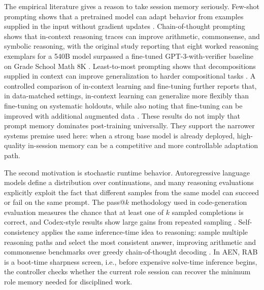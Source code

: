 \documentclass[11pt]{article}
\newcommand{\rab}{RAB}
\begin{document}
The empirical literature gives a reason to take session memory seriously. Few-shot prompting shows that a pretrained model can adapt behavior from examples supplied in the input without gradient updates \citep{brown2020fewshot}. Chain-of-thought prompting shows that in-context reasoning traces can improve arithmetic, commonsense, and symbolic reasoning, with the original study reporting that eight worked reasoning exemplars for a 540B model surpassed a fine-tuned GPT-3-with-verifier baseline on Grade School Math 8K \citep{wei2022cot}. Least-to-most prompting shows that decompositions supplied in context can improve generalization to harder compositional tasks \citep{zhou2022leasttomost}. A controlled comparison of in-context learning and fine-tuning further reports that, in data-matched settings, in-context learning can generalize more flexibly than fine-tuning on systematic holdouts, while also noting that fine-tuning can be improved with additional augmented data \citep{lampinen2025generalization}. These results do not imply that prompt memory dominates post-training universally. They support the narrower systems premise used here: when a strong base model is already deployed, high-quality in-session memory can be a competitive and more controllable adaptation path.

The second motivation is stochastic runtime behavior. Autoregressive language models define a distribution over continuations, and many reasoning evaluations explicitly exploit the fact that different samples from the same model can succeed or fail on the same prompt. The pass@\(k\) methodology used in code-generation evaluation measures the chance that at least one of \(k\) sampled completions is correct, and Codex-style results show large gains from repeated sampling \citep{chen2021codex}. Self-consistency applies the same inference-time idea to reasoning: sample multiple reasoning paths and select the most consistent answer, improving arithmetic and commonsense benchmarks over greedy chain-of-thought decoding \citep{wang2022selfconsistency}. In AEN, \rab{} is a boot-time sharpness screen, i.e., before expensive solve-time inference begins, the controller checks whether the current role session can recover the minimum role memory needed for disciplined work.
\end{document}
